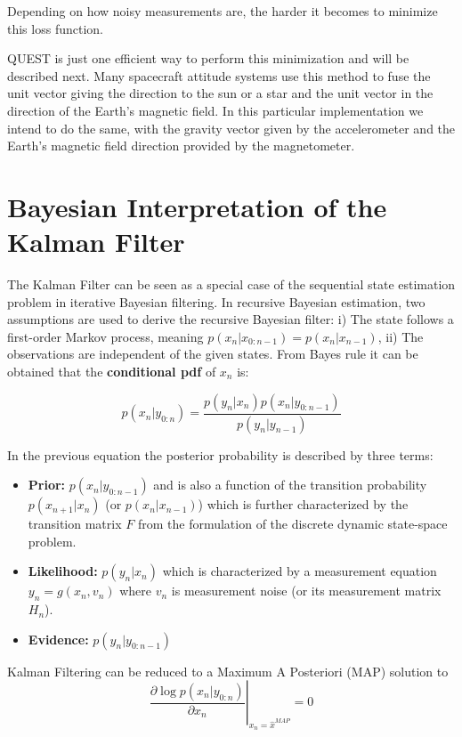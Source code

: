 \documentclass[a4paper,10pt]{article}
\begin{document}
Depending on how noisy measurements are, the harder it becomes to minimize this loss function. 

QUEST is just one efficient way to perform this minimization and will be described next. Many spacecraft attitude systems use this method to fuse the unit vector giving the direction to the sun or a star and the unit vector in the direction of the Earth's magnetic field. In this particular implementation we intend to do the same, with the gravity vector given by the accelerometer and the Earth's magnetic field direction provided by the magnetometer.

\section{Bayesian Interpretation of the Kalman Filter}
The Kalman Filter can be seen as a special case of the sequential state estimation problem in iterative Bayesian filtering. In recursive Bayesian estimation, two assumptions are used to derive the recursive Bayesian filter: i) The state follows a first-order Markov process, meaning $p(x_n | x_{0:n-1}) = p(x_n | x_{n-1})$, ii) The observations are independent of the given states. From Bayes rule it can be obtained that the \textbf{conditional pdf} of $x_n$  is:

\begin{equation}
 p(x_n|y_{0:n}) = \frac{p(y_n|x_n)p(x_n|y_{0:n-1})}{p(y_n|y_{n-1})}
\end{equation}

In the previous equation the posterior probability is described by three terms:
\begin{itemize}
 \item \textbf{Prior:} $p(x_n|y_{0:n-1})$ and is also a function of the transition probability $p(x_{n+1}|x_n)$ (or $p(x_{n}|x_{n-1})$) which is further characterized by the transition matrix $F$ from the formulation of the discrete dynamic state-space problem. 
 \item \textbf{Likelihood:} $p(y_n|x_n)$ which is characterized by a measurement equation $y_n = g(x_n, v_n)$ where $v_n$ is measurement noise (or its measurement matrix $H_n$).
 \item \textbf{Evidence:} $p(y_n|y_{0:n-1})$
\end{itemize}

Kalman Filtering can be reduced to a Maximum A Posteriori (MAP) solution to
\begin{equation}
 \left.\frac{\partial \log p(x_n|y_{0:n})}{\partial x_n}\right\vert_{x_n = \hat{x}^{MAP}} = 0
\end{equation}
\end{document}
